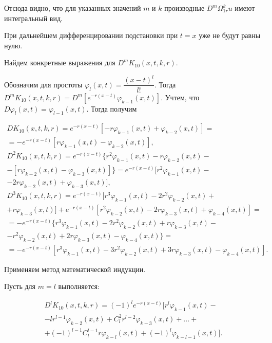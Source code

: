 Отсюда видно, что для указанных значений $ m $ и $ k $ производные $ D^m\Omega_{1r}^ku $ имеют интегральный вид.

При дальнейшем дифференцировании подстановки при $ t = x $ уже не будут равны нулю.


Найдем конкретные выражения для $ D^mK_{10}(x,t,k,r) $.


Обозначим для простоты $ \varphi_l(x,t) = \dfrac{(x-t)^l}{l!} $.
Тогда $ D^mK_{10}(x,t,k,r) = D^m[e^{-r(x-t)}\varphi_{k-1}(x,t)]$.
Учтем, что $ D\varphi_l(x,t) = \varphi_{l-1}(x,t) $.
Тогда получим

\begin{equation}
\begin{array}{c}
\nonumber

DK_{10}(x,t,k,r) = e^{-r(x-t)}[-r\varphi_{k-1}(x,t) + \varphi_{k-2}(x,t)] = \\
= -e^{-r(x-t)}[r\varphi_{k-1}(x,t) - \varphi_{k-2}(x,t)], \\
D^2K_{10}(x,t,k,r) = e^{-r(x-t)}\lbrace r^2\varphi_{k-1}(x,t) - r\varphi_{k-2}(x,t) - \\ - [r\varphi_{k-2}(x,t) - \varphi_{k-3}(x,t)]\rbrace = e^{-r(x-t)}[r^2\varphi_{k-1}(x,t) - \\ -2r\varphi_{k-2}(x,t) + \varphi_{k-3}(x,t)], \\
D^3K_{10}(x,t,k,r) = e^{-r(x-t)}[r^3\varphi_{k-1}(x,t) -  2r^2\varphi_{k-2}(x,t) + \\ + r\varphi_{k-3}(x,t)] + e^{-r(x-t)}[r^2\varphi_{k-2}(x,t) - 2r\varphi_{k-3}(x,t) + \varphi_{k-4}(x,t)] = \\
= -e^{-r(x-t)}\lbrace r^3\varphi_{k-1}(x,t) - 2r^2\varphi_{k-2}(x,t) + r\varphi_{k-3}(x,t) - \\ - r^2\varphi_{k-2}(x,t) + 2r\varphi_{k-3}(x,t) - \varphi_{k-4}(x,t)\rbrace = \\ = -e^{-r(x-t)}[r^3\varphi_{k-1}(x,t) -3r^2\varphi_{k-2}(x,t) + 3r\varphi_{k-3}(x,t) - \varphi_{k-4}(x,t)].

\end{array}
\end{equation}

Применяем метод математической индукции.

Пусть для $ m = l $ выполняется:

\begin{equation}
\begin{array}{c}

D^lK_{10}(x,t,k,r) = (-1)^le^{-r(x-t)}[r^l\varphi_{k-1}(x,t) - \\ - lr^{l-1}\varphi_{k-2}(x,t) + C_l^2r^{l-2}\varphi_{k-3}(x,t) + ... + \\ + (-1)^{l-1}C_l^{l-1}r\varphi_{k-l}(x,t) + (-1)^l\varphi_{k-l-1}(x,t)].

\end{array}
\end{equation}

